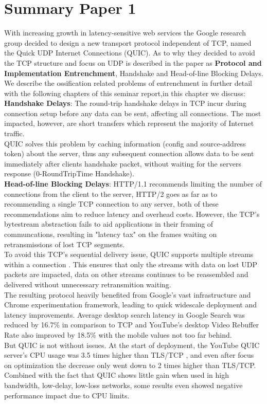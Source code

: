 \section{Summary Paper 1}
\label{sec:Summary Paper 1}
With increasing growth in latency-sensitive web services the Google research group decided to design a new transport protocol independent of TCP, named the Quick UDP Internet Connections (QUIC). As to why they decided to avoid the TCP structure and focus on UDP is described in the paper as \textbf{Protocol and Implementation Entrenchment}, Handshake and Head-of-line Blocking Delays. We describe the ossification related problems of entrenchment in further detail with the following chapters of this seminar report,in this chapter we discuss:\\
\hspace*{1em}\textbf{Handshake Delays}: The round-trip handshake delays in TCP incur during connection setup before any data can be sent, affecting all connections. The most impacted, however, are short transfers which represent the majority of Internet traffic. \\
QUIC solves this problem by caching information (config and source-address token) about the server, thus any subsequent connection allows data to be sent immediately after clients handshake packet, without waiting for the servers response (0-RoundTripTime Handshake). \\
\hspace*{1em}\textbf{Head-of-line Blocking Delays}: HTTP/1.1 recommends limiting the number of connections from the client to the server, HTTP/2 goes as far as to recommending a single TCP connection to any server, both of these recommendations aim to reduce latency and overhead costs. However, the TCP's bytestream abstraction fails to aid applications in their framing of communcations, resulting in "latency tax" \cite{langley2017quic} on the frames waiting on retransmissions of lost TCP segments.\\ 
To avoid this TCP's sequential delivery issue, QUIC supports multiple streams within a connection \cite{langley2017quic}. This ensures that only the streams with data on lost UDP packets are impacted, data on other streams continues to be reassembled and delivered without unnecessary retransmition waiting.\\
\hspace*{1em}The resulting protocol heavily benefited from Google's vast infrastructure and Chrome experimentation framework, leading to quick widescale deployment and latency improvements. Average desktop search latency in Google Search was reduced by 16.7\% in comparison to TCP and YouTube's desktop Video Rebuffer Rate also improved by 18.5\% with the mobile values not too far behind.\\
\hspace*{1em}But QUIC is not without issues. At the start of deployment, the YouTube QUIC server's CPU usage was 3.5 times higher than TLS/TCP \cite{langley2017quic}, and even after focus on optimization the decrease only went down to 2 times higher than TLS/TCP. Combined with the fact that QUIC shows little gain when used in high bandwidth, low-delay, low-loss networks, some results even showed negative performance impact due to CPU limits.

